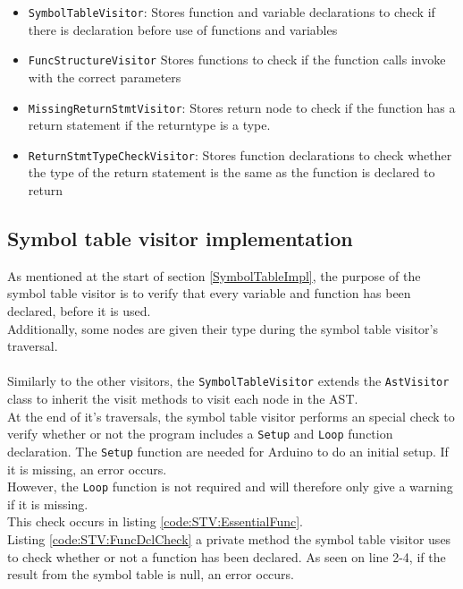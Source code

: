\begin{itemize}
    \item \texttt{SymbolTableVisitor}: Stores function and variable declarations to check if there is declaration before use of functions and variables
    \item \texttt{FuncStructureVisitor} Stores functions to check if the function calls invoke with the correct parameters
    \item \texttt{MissingReturnStmtVisitor}: Stores return node to check if the function has a return statement if the returntype is a type.
    \item \texttt{ReturnStmtTypeCheckVisitor}: Stores function declarations to check whether the type of the return statement is the same as the function is declared to return
\end{itemize}

\subsection{Symbol table visitor implementation}
As mentioned at the start of section \ref{SymbolTableImpl}, the purpose of the symbol table visitor is to verify that every variable and function has been declared, before it is used.\\
Additionally, some nodes are given their type during the symbol table visitor’s traversal.
\\\\
Similarly to the other visitors, the \texttt{SymbolTableVisitor} extends the \texttt{AstVisitor} class to inherit the visit methods to visit each node in the AST.\\
At the end of it's traversals, the symbol table visitor performs an special check to verify whether or not the program includes a \texttt{Setup} and \texttt{Loop} function declaration. The \texttt{Setup} function are needed for Arduino to do an initial setup. If it is missing, an error occurs.\\
However, the \texttt{Loop} function is not required and will therefore only give a warning if it is missing.\\
This check occurs in listing \ref{code:STV:EssentialFunc}.\\

\noindent\newline
Listing \ref{code:STV:FuncDclCheck} a  private method the symbol table visitor uses to check whether or not a function has been declared. As seen on line 2-4, if the result from the symbol table is null, an error occurs. 

\noindent